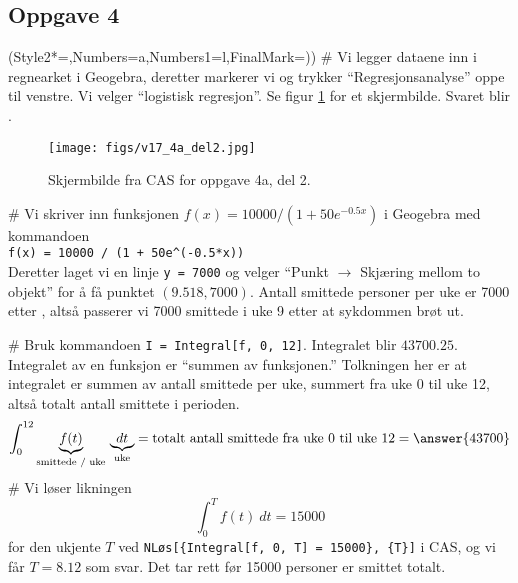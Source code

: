 \subsection*{Oppgave 4}
\begin{easylist}[enumerate]
	\ListProperties(Style2*=,Numbers=a,Numbers1=l,FinalMark={)})
	# Vi legger dataene inn i regnearket i Geogebra, deretter markerer vi og trykker  ``Regresjonsanalyse'' oppe til venstre. Vi velger 
	``logistisk regresjon''. Se figur \ref{fig:cas4} for et skjermbilde.
	Svaret blir .
	\begin{figure}[th!]
		\centering
		\texttt{[image: figs/v17\_4a\_del2.jpg]}
		\caption{Skjermbilde fra CAS for oppgave 4a, del 2.}
		\label{fig:cas4}
	\end{figure} 

	# Vi skriver inn funksjonen $f(x) = 10000 / (1 + 50 e^{-0.5x})$ i Geogebra med kommandoen \\
	\verb|f(x) = 10000 / (1 + 50e^(-0.5*x))| \\
	Deretter laget vi en linje \verb|y = 7000| og velger ``Punkt $\to$ Skjæring mellom to objekt''
	for å få punktet $(9.518, 7000)$. Antall smittede personer per uke er 7000 etter , altså passerer vi 7000 smittede i uke 9 etter at sykdommen brøt ut.
	 
	# Bruk kommandoen \verb|I = Integral[f, 0, 12]|. Integralet blir $43700.25$.
	Integralet av en funksjon er ``summen av funksjonen.'' Tolkningen her er at
	integralet er summen av antall smittede per uke, summert fra uke 0 til uke 12, altså totalt antall smittete i perioden.
	\begin{equation*}
		\int_{0}^{12} \underset{\text{smittede / uke}}{\underbrace{f(t)}} \ \underset{\text{uke}}{\underbrace{dt}} = \text{totalt antall smittede fra uke 0 til uke 12} = \answer{43700}
	\end{equation*}
	# Vi løser likningen
	\begin{equation*}
		\int_{0}^{T} f(t) \ dt = 15 000
	\end{equation*}
	for den ukjente $T$ ved \verb|NLøs[{Integral[f, 0, T] = 15000}, {T}]|
	i CAS, og vi får $T = 8.12$ som svar. Det tar rett  før 15000 personer
	er smittet totalt.
\end{easylist}
	
	



